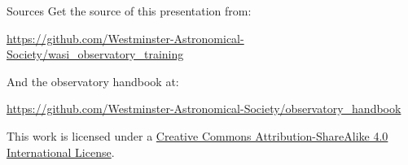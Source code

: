 
\begin{frame}{Sources}
   Get the source of this presentation from:

  \begin{center}
    \small
    \url{https://github.com/Westminster-Astronomical-Society/wasi_observatory_training}
  \end{center} 

  And the observatory handbook at:

  \begin{center}
    \small
    \url{https://github.com/Westminster-Astronomical-Society/observatory_handbook}
  \end{center}

  This work is licensed under a
  \href{http://creativecommons.org/licenses/by-sa/4.0/}{Creative Commons
  Attribution-ShareAlike 4.0 International License}.

  \begin{center}\ccbysa\end{center}
\end{frame}

